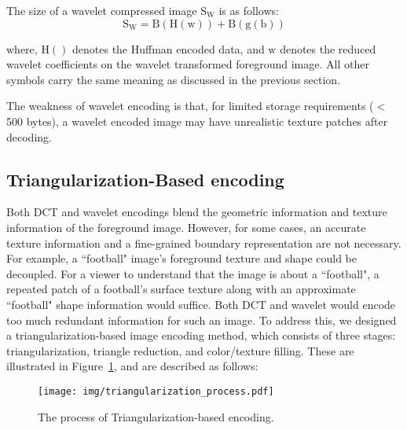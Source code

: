 
The size of a wavelet compressed image $\mathrm{S_{W}}$ is as follows:
\begin{equation}
\mathrm{S_{W} = B(H(w)) + B(g(b))}
\end{equation}

where, $\mathrm{H()}$ denotes the Huffman encoded data, and $\mathrm{w}$ denotes the reduced wavelet coefficients on the wavelet transformed foreground image. All other symbols carry the same meaning as discussed in the previous section.


The weakness of wavelet encoding is that, for limited storage requirements ($<$ 500 bytes), a wavelet encoded image may have unrealistic texture patches after decoding.

\subsection{Triangularization-Based encoding}

Both DCT and wavelet encodings blend the geometric information and texture information of the foreground image. However, for some cases, an accurate texture information and a fine-grained boundary representation are not necessary. For example, a ``football" image's foreground texture and shape could be decoupled. For a viewer to understand that the image is about a ``football", a repeated patch of a football's surface texture along with an approximate ``football" shape information would suffice. Both DCT and wavelet would encode too much redundant information for such an image. To address this, we designed a triangularization-based image encoding method, which consists of three stages: triangularization, triangle reduction, and color/texture filling. These are illustrated in Figure~\ref{fig:tri}, and are described as follows:

\begin{figure}[!thb]
    \begin{center}
	    \texttt{[image: img/triangularization\_process.pdf]}
	    \caption{\footnotesize The process of Triangularization-based encoding.}
	    \label{fig:tri}
    \end{center}
\end{figure}

